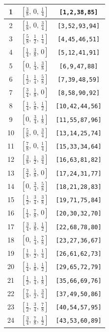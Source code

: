 \documentclass[fleqn,8pt]{jsarticle}
\begin{document}
\begin{longtable}{ccc}
1 & $\left[ \frac{3}{8},\, 0,\, \frac{1}{4} \right]$ & {\tt [1,2,38,85]} \\ \hline
2 & $\left[ \frac{1}{8},\, 0,\, \frac{3}{4} \right]$ & {\tt [3,52,93,94]} \\ \hline
3 & $\left[ \frac{5}{8},\, \frac{1}{2},\, \frac{1}{4} \right]$ & {\tt [4,45,46,51]} \\ \hline
4 & $\left[ \frac{1}{4},\, \frac{3}{8},\, 0 \right]$ & {\tt [5,12,41,91]} \\ \hline
5 & $\left[ 0,\, \frac{1}{4},\, \frac{3}{8} \right]$ & {\tt [6,9,47,88]} \\ \hline
6 & $\left[ \frac{1}{2},\, \frac{1}{4},\, \frac{5}{8} \right]$ & {\tt [7,39,48,59]} \\ \hline
7 & $\left[ \frac{3}{4},\, \frac{1}{8},\, 0 \right]$ & {\tt [8,58,90,92]} \\ \hline
8 & $\left[ \frac{1}{4},\, \frac{5}{8},\, \frac{1}{2} \right]$ & {\tt [10,42,44,56]} \\ \hline
9 & $\left[ 0,\, \frac{3}{4},\, \frac{1}{8} \right]$ & {\tt [11,55,87,96]} \\ \hline
10 & $\left[ \frac{5}{8},\, 0,\, \frac{3}{4} \right]$ & {\tt [13,14,25,74]} \\ \hline
11 & $\left[ \frac{7}{8},\, 0,\, \frac{1}{4} \right]$ & {\tt [15,33,34,64]} \\ \hline
12 & $\left[ \frac{3}{8},\, \frac{1}{2},\, \frac{3}{4} \right]$ & {\tt [16,63,81,82]} \\ \hline
13 & $\left[ \frac{3}{4},\, \frac{5}{8},\, 0 \right]$ & {\tt [17,24,31,77]} \\ \hline
14 & $\left[ 0,\, \frac{3}{4},\, \frac{5}{8} \right]$ & {\tt [18,21,28,83]} \\ \hline
15 & $\left[ \frac{1}{2},\, \frac{3}{4},\, \frac{3}{8} \right]$ & {\tt [19,71,75,84]} \\ \hline
16 & $\left[ \frac{1}{4},\, \frac{7}{8},\, 0 \right]$ & {\tt [20,30,32,70]} \\ \hline
17 & $\left[ \frac{3}{4},\, \frac{3}{8},\, \frac{1}{2} \right]$ & {\tt [22,68,78,80]} \\ \hline
18 & $\left[ 0,\, \frac{1}{4},\, \frac{7}{8} \right]$ & {\tt [23,27,36,67]} \\ \hline
19 & $\left[ \frac{1}{8},\, \frac{1}{2},\, \frac{1}{4} \right]$ & {\tt [26,61,62,73]} \\ \hline
20 & $\left[ \frac{1}{4},\, \frac{1}{8},\, \frac{1}{2} \right]$ & {\tt [29,65,72,79]} \\ \hline
21 & $\left[ \frac{1}{2},\, \frac{1}{4},\, \frac{1}{8} \right]$ & {\tt [35,66,69,76]} \\ \hline
22 & $\left[ \frac{7}{8},\, \frac{1}{2},\, \frac{3}{4} \right]$ & {\tt [37,49,50,86]} \\ \hline
23 & $\left[ \frac{1}{2},\, \frac{3}{4},\, \frac{7}{8} \right]$ & {\tt [40,54,57,95]} \\ \hline
24 & $\left[ \frac{3}{4},\, \frac{7}{8},\, \frac{1}{2} \right]$ & {\tt [43,53,60,89]} \\
\end{longtable}
\end{document}
